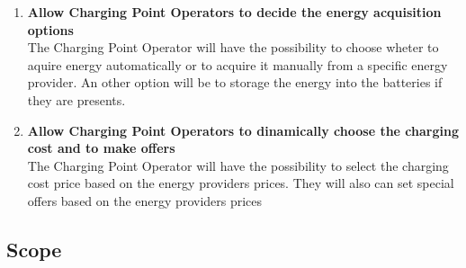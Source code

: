 \begin{enumerate}[label=$\bullet$ \textbf{G\arabic*:}]
        \item \textbf{Allow Charging Point Operators to decide the energy acquisition options}
        \\
        The Charging Point Operator will have the possibility to choose wheter to aquire energy automatically or to acquire it manually from a specific energy provider.
        An other option will be to storage the energy into the batteries if they are presents.
        \item \textbf{Allow Charging Point Operators to dinamically choose the charging cost and to make offers}
        \\
        The Charging Point Operator will have the possibility to select the charging cost price based on the energy providers prices. They will also can set special offers based on the energy providers prices
        


\end{enumerate}

\subsection{Scope}
